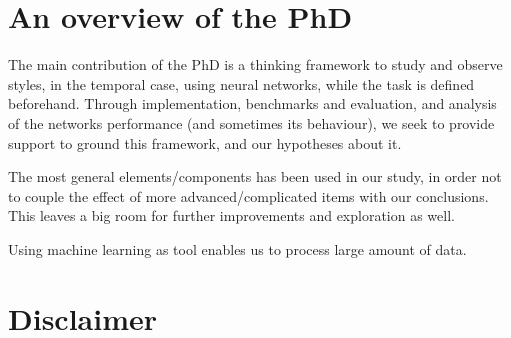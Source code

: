 \section{An overview of the PhD}
\par The main contribution of the PhD is a thinking framework to study and observe styles, in the temporal case, using neural networks, while the task is defined beforehand. Through implementation, benchmarks and evaluation, and analysis of the networks performance (and sometimes its behaviour), we seek to provide support to ground this framework, and our hypotheses about it.

\par The most general elements/components has been used in our study, in order not to couple the effect of more advanced/complicated items with our conclusions. This leaves a big room for further improvements and exploration as well.

\par Using machine learning as tool enables us to process large amount of data. 

\section{Disclaimer}
\par 